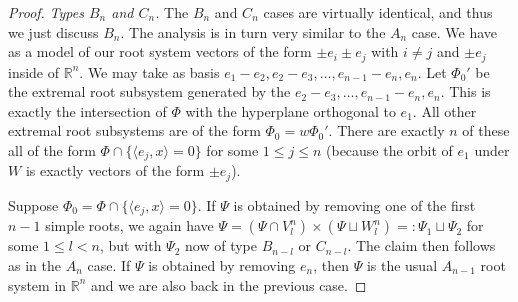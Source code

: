 \documentclass[10pt,a4paper]{amsart}
\begin{document}
\begin{proof}

\medskip

    \noindent \textit{Types $B_n$ and $C_n$.} The $B_n$ and $C_n$ cases are virtually identical, and thus we just discuss $B_n$. The analysis is in turn very similar to the $A_n$ case. We have as a model of our root system vectors of the form $\pm e_i \pm e_j$ with $i \neq j$ and $\pm e_j$ inside of $\mathbb{R}^n$. We may take as basis $e_1 - e_2, e_2 - e_3, \dots, e_{n-1} - e_n, e_n$. Let $\Phi_0'$ be the extremal root subsystem generated by the $e_2 - e_3, \dots, e_{n-1} - e_n, e_n$. This is exactly the intersection of $\Phi$ with the hyperplane orthogonal to $e_1$. All other extremal root subsystems are of the form $\Phi_0=w \Phi_0'$. There are exactly $n$ of these all of the form $\Phi \cap \{\langle e_j, x \rangle = 0\}$ for some $1 \leq j \leq n$ (because the orbit of $e_1$ under $W$ is exactly vectors of the form $\pm e_j$).

    Suppose $\Phi_0 = \Phi \cap \{ \langle e_j, x \rangle = 0\}$. If $\Psi$ is obtained by removing one of the first $n-1$ simple roots, we again have $\Psi=(\Psi\cap V^{n}_l) \times (\Psi\sqcup W^{n}_l)=:\Psi_1\sqcup\Psi_2$ for some $1\le l<n$, but with $\Psi_2$ now of type $B_{n-l}$ or $C_{n-l}$. The claim then follows as in the $A_n$ case. If $\Psi$ is obtained by removing $e_n$, then $\Psi$ is the usual $A_{n-1}$ root system in $\mathbb{R}^{n}$ and we are also back in the previous case.
    

\end{proof}
\end{document}
